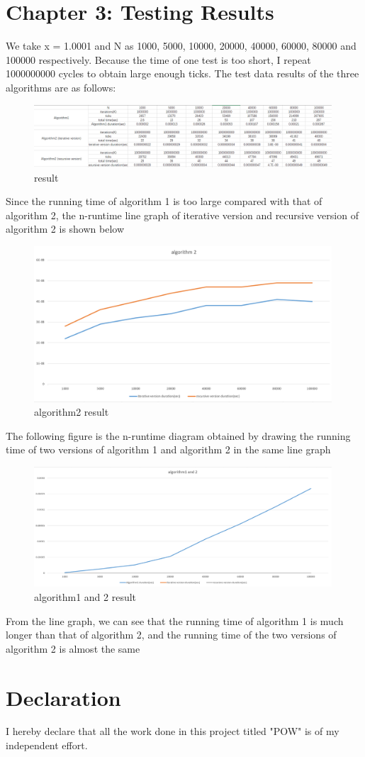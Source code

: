 \documentclass{article}
\begin{document}
\section{Chapter 3:  Testing Results}
We take x = 1.0001 and N as 1000, 5000, 10000, 20000, 40000, 60000, 80000 and 100000 respectively. Because the time of one test is too short, I repeat 1000000000 cycles to obtain large enough ticks. The test data results of the three algorithms are as follows:
\begin{figure}[H]
\centering
\includegraphics[width=0.99\textwidth]{result.png}
\caption{result}
\end{figure}
\par Since the running time of algorithm 1 is too large compared with that of algorithm 2, the n-runtime line graph of iterative version and recursive version of algorithm 2 is shown below
\begin{figure}[H]
\centering
\includegraphics[width=0.99\textwidth]{algorithm2_result.png}
\caption{algorithm2 result}
\end{figure}
\par The following figure is the n-runtime diagram obtained by drawing the running time of two versions of algorithm 1 and algorithm 2 in the same line graph
\begin{figure}[H]
\centering
\includegraphics[width=0.99\textwidth]{algorithm1 and 2 result.png}
\caption{algorithm1 and 2 result}
\end{figure}
\par From the line graph, we can see that the running time of algorithm 1 is much longer than that of algorithm 2, and the running time of the two versions of algorithm 2 is almost the same

\section{Declaration}
I  hereby   declare   that   all   the   work   done   in   this   project   titled "POW" is of my independent effort.
\end{document}

